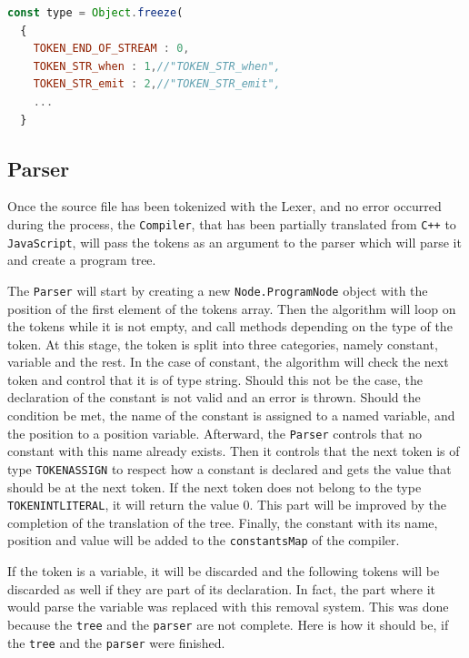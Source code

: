 \documentclass{scrreprt}
\begin{document}
\begin{lstlisting}[language=JavaScript, gobble=2, basicstyle=\ttfamily\small]
  const type = Object.freeze( 
  {
    TOKEN_END_OF_STREAM : 0,
    TOKEN_STR_when : 1,//"TOKEN_STR_when",
    TOKEN_STR_emit : 2,//"TOKEN_STR_emit",
    ...
  }
\end{lstlisting}

\subsection{Parser}

Once the source file has been tokenized with the Lexer, and no error occurred during the process, the \texttt{Compiler}, that has been partially translated from \texttt{C++} to \texttt{JavaScript}, will pass the tokens as an argument to the parser which will parse it and create a program tree.

The \texttt{Parser} will start by creating a new \texttt{Node.ProgramNode} object with the position of the first element of the tokens array. Then the algorithm will loop on the tokens while it is not empty, and call methods depending on the type of the token. At this stage, the token is split into three categories, namely constant, variable and the rest. 
In the case of constant, the algorithm will check the next token and control that it is of type string. Should this not be the case, the declaration of the constant is not valid and an error is thrown. Should the condition be met, the name of the constant is assigned to a named variable, and the position to a position variable. 
Afterward, the \texttt{Parser} controls that no constant with this name already exists. Then it controls that the next token is of type \texttt{TOKEN\textunderscore ASSIGN} to respect how a constant is declared and gets the value that should be at the next token. If the next token does not belong to the type \texttt{TOKEN\textunderscore INT\textunderscore LITERAL}, it will return the value 0. 
This part will be improved by the completion of the translation of the tree. Finally, the constant with its name, position and value will be added to the \texttt{constantsMap} of the compiler.

If the token is a variable, it will be discarded and the following tokens will be discarded as well if they are part of its declaration. In fact, the part where it would parse the variable was replaced with this removal system. This was done because the \texttt{tree} and the \texttt{parser} are not complete. 
Here is how it should be, if the \texttt{tree} and the \texttt{parser} were finished.
\end{document}

